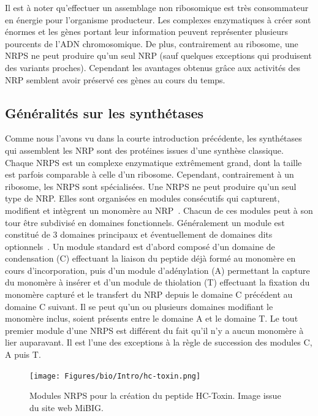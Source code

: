 Il est à noter qu'effectuer un assemblage non ribosomique est très consommateur en énergie pour l'organisme producteur.
Les complexes enzymatiques à créer sont énormes et les gènes portant leur information peuvent représenter plusieurs pourcents de l'ADN chromosomique.
De plus, contrairement au ribosome, une NRPS ne peut produire qu'un seul NRP (sauf quelques exceptions qui produisent des variants proches).
Cependant les avantages obtenus grâce aux activités des NRP semblent avoir préservé ces gènes au cours du temps.


\subsection{Généralités sur les synthétases}

Comme nous l'avons vu dans la courte introduction précédente, les synthétases qui assemblent les NRP sont des protéines issues d'une synthèse classique.
Chaque NRPS est un complexe enzymatique extrêmement grand, dont la taille est parfois comparable à celle d'un ribosome.
Cependant, contrairement à un ribosome, les NRPS sont spécialisées.
Une NRPS ne peut produire qu'un seul type de NRP.
Elles sont organisées en modules consécutifs qui capturent, modifient et intègrent un monomère au NRP~\cite{schwarzer_nonribosomal_2003,marahiel_modular_1997}.
Chacun de ces modules peut à son tour être subdivisé en domaines fonctionnels.
Généralement un module est constitué de 3 domaines principaux et éventuellement de domaines dits optionnels~\cite{finking_biosynthesis_2004}.
Un module standard est d'abord composé d'un domaine de condensation (C) effectuant la liaison du peptide déjà formé au monomère en cours d'incorporation, puis d'un module d'adénylation (A) permettant la capture du monomère à insérer et d'un module de thiolation (T) effectuant la fixation du monomère capturé et le transfert du NRP depuis le domaine C précédent au domaine C suivant.
Il se peut qu'un ou plusieurs domaines modifiant le monomère inclus, soient présents entre le domaine A et le domaine T.
Le tout premier module d'une NRPS est différent du fait qu'il n'y a aucun monomère à lier auparavant.
Il est l'une des exceptions à la règle de succession des modules C, A puis T.

\begin{figure}[h!]
  \begin{center}
    \texttt{[image: Figures/bio/Intro/hc-toxin.png]}
    \caption{\label{mibig_hc}Modules NRPS pour la création du peptide HC-Toxin.
    Image issue du site web MiBIG.}
  \end{center}
\end{figure}

